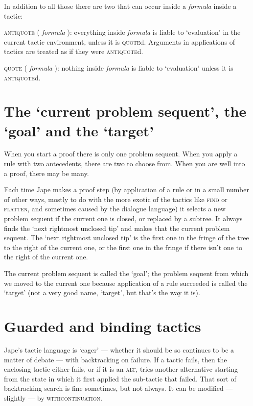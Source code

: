 In addition to all those there are two that can occur inside a \textit{formula} inside a tactic:


\textsc{antiquote} ( \textit{formula} ): everything inside \textit{formula} is liable to `evaluation' in the current tactic environment, unless it is \textsc{quote}d. Arguments in applications of tactics are treated as if they were \textsc{antiquote}d.


\textsc{quote} ( \textit{formula} ): nothing inside \textit{formula} is liable to `evaluation' unless it is \textsc{antiquote}d.


\section{The `current problem sequent', the `goal' and the `target'}


When you start a proof there is only one problem sequent. When you apply a rule with two antecedents, there are two to choose from. When you are well into a proof, there may be many.


Each time Jape makes a proof step (by application of a rule or in a small number of other ways, mostly to do with the more exotic of the tactics like \textsc{find} or \textsc{flatten}, and sometimes caused by the dialogue language) it selects a new problem sequent if the current one is closed, or replaced by a subtree. It always finds the `next rightmost unclosed tip' and makes that the current problem sequent. The `next rightmost unclosed tip' is the first one in the fringe of the tree to the right of the current one, or the first one in the fringe if there isn't one to the right of the current one.


The current problem sequent is called the `goal'; the problem sequent from which we moved to the current one because application of a rule succeeded is called the `target' (not a very good name, `target', but that's the way it is).


\section{Guarded and binding tactics}


Jape's tactic language is `eager' --- whether it should be so continues to be a matter of debate --- with backtracking on failure. If a tactic fails, then the enclosing tactic either fails, or if it is an \textsc{alt}, tries another alternative starting from the state in which it first applied the sub-tactic that failed. That sort of backtracking search is fine sometimes, but not always. It can be modified --- slightly --- by \textsc{withcontinuation}.


